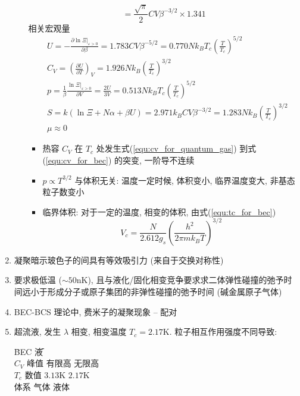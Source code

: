 \documentclass[12pt,a4paper]{article}%
\numberwithin{equation}{section}
\begin{document}
\begin{enumerate}
\begin{itemize}
\begin{equation}
            =\frac{\sqrt\pi}2 CV\beta^{-3/2}\times1.341
        \end{equation}
        相关宏观量
        \begin{align}
            &U = -\frac{\partial\ln\Xi|_{\varepsilon>0}}{\partial\beta}
            = 1.783 CV\beta^{-5/2} = 0.770Nk_BT_c\left(\frac{T}{T_c}\right)^{5/2}\\
            &C_V = \left(\frac{\partial U}{\partial T}\right)_V 
            = 1.926 Nk_B\left(\frac{T}{T_c}\right)^{3/2} \label{equ:cv_for_bec}\\
            &p = \frac 1\beta \frac{\ln\Xi|_{\varepsilon>0}}{\partial V}
            = \frac{2U}{3V} = 0.513Nk_BT_c\left(\frac{T}{T_c}\right)^{5/2}\\
            &S = k(\ln\Xi + N\alpha + \beta U) = 2.971 k_BCV\beta^{-3/2} 
            = 1.283Nk_B\left(\frac{T}{T_c}\right)^{3/2} \\
            &\mu \approx 0
        \end{align}
        \begin{itemize}
            \item 热容 $C_V$ 在 $T_c$ 处发生式(\ref{equ:cv_for_quantum_gas}) 到式(\ref{equ:cv_for_bec}) 的突变, 一阶导不连续
            \item $p\propto T^{3/2}$ 与体积无关: 
            温度一定时候, 体积变小, 临界温度变大, 非基态粒子数变小
            \item 临界体积: 对于一定的温度, 相变的体积, 由式(\ref{equ:tc_for_bec})
            \begin{equation}
                V_c = \frac{N}{2.612g_s}\left(\frac{h^2}{2\pi mk_BT}\right)^{3/2}
            \end{equation}
        \end{itemize}
    \end{itemize}
    \item 凝聚暗示玻色子的间具有等效吸引力 (来自于交换对称性)
    \item 要求极低温 ($\sim 50$nK), 且与液化/固化相变竞争要求求二体弹性碰撞的弛予时间远小于形成分子或原子集团的非弹性碰撞的弛予时间 (碱金属原子气体)
    \item BEC-BCS 理论中, 费米子的凝聚现象 -- 配对
    \item 超流液, 发生 $\lambda$ 相变, 相变温度 $T_c=2.17$K. 粒子相互作用强度不同导致: 
    \begin{tabbing}
        \hspace*{80bp}\=BEC\hspace*{30bp} \=液\hspace*{30bp} \\
        $C_V$ 峰值 \>有限高      \>无限高 \\
        $T_c$ 数值 \>$3.13$K     \>$2.17$K \\
        体系       \>气体        \>液体
    \end{tabbing}
\end{enumerate}
\end{document}
